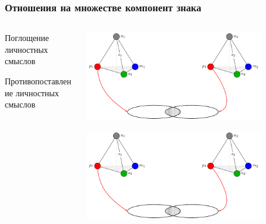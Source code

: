 \documentclass[default]{beamer}
\begin{document}
	\begin{frame}
		\frametitle{Отношения на множестве компонент знака}
		
		\begin{columns}
			\begin{column}{0.3\textwidth}
				\centering
				Поглощение личностных смыслов 
				\par\bigskip
				\par\bigskip
				\par\bigskip
				\par\bigskip
				\par\bigskip
				Противопоставление личностных смыслов 
				
			\end{column}
			\begin{column}{0.7\textwidth}
				\includegraphics[page=5,width=0.8\textwidth]{signs/sign_relations}
				\par\bigskip
				\includegraphics[page=6,width=0.8\textwidth]{signs/sign_relations}
			\end{column}
		\end{columns}
	\end{frame}	
\end{document}
